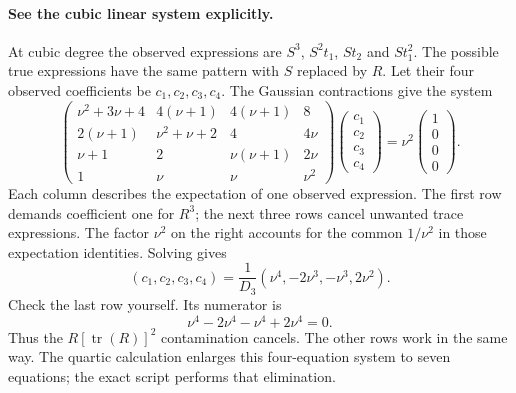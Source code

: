 \documentclass[11pt]{article}
\begin{document}
\paragraph{See the cubic linear system explicitly.}
At cubic degree the observed expressions are $S^3$, $S^2t_1$, $S t_2$
and $S t_1^2$. The possible true expressions have the same pattern with
$S$ replaced by $R$. Let their four observed coefficients be $c_1,c_2,c_3,c_4$.
The Gaussian contractions give the system
\begin{equation}
 \begin{pmatrix}
 \nu^2+3\nu+4 & 4(\nu+1) & 4(\nu+1) & 8\\
 2(\nu+1) & \nu^2+\nu+2 & 4 & 4\nu\\
 \nu+1 & 2 & \nu(\nu+1) & 2\nu\\
 1 & \nu & \nu & \nu^2
 \end{pmatrix}
 \begin{pmatrix}c_1\\c_2\\c_3\\c_4\end{pmatrix}
 =\nu^2\begin{pmatrix}1\\0\\0\\0\end{pmatrix}.
\end{equation}
Each column describes the expectation of one observed expression. The first
row demands coefficient one for $R^3$; the next three rows cancel unwanted
trace expressions. The factor $\nu^2$ on the right accounts for the common
$1/\nu^2$ in those expectation identities. Solving gives
\begin{equation}
 (c_1,c_2,c_3,c_4)=\frac1{D_3}(\nu^4,-2\nu^3,-\nu^3,2\nu^2).
\end{equation}
Check the last row yourself. Its numerator is
\begin{equation}
 \nu^4-2\nu^4-\nu^4+2\nu^4=0.
\end{equation}
Thus the $R[\operatorname{tr}(R)]^2$ contamination cancels. The other rows
work in the same way. The quartic calculation enlarges this four-equation
system to seven equations; the exact script performs that elimination.
\end{document}
